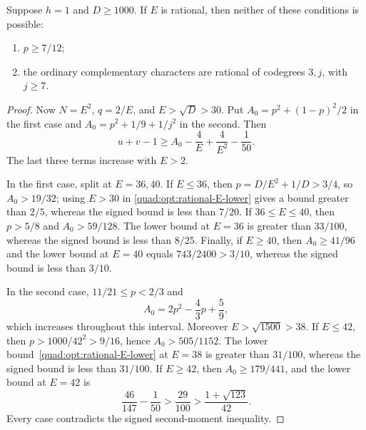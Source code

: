 \begin{lemma}\label{quad:opt:rational-selected-E}
Suppose $h=1$ and $D\ge1000$. If $E$ is rational, then neither of
these conditions is possible:
\begin{enumerate}
\item $p\ge7/12$;
\item the ordinary complementary characters are rational of codegrees
$3,j$, with $j\ge7$.
\end{enumerate}
\end{lemma}
\begin{proof}
Now $N=E^2$, $q=2/E$, and $E>\sqrt D>30$. Put
$A_0=p^2+(1-p)^2/2$ in the first case and
$A_0=p^2+1/9+1/j^2$ in the second. Then
\begin{equation}\label{quad:opt:rational-E-lower}
 u+v-1\ge A_0-\frac4E+\frac4{E^2}-\frac1{50}.
\end{equation}
The last three terms increase with $E>2$.

In the first case, split at $E=36,40$. If $E\le36$, then
$p=D/E^2+1/D>3/4$, so $A_0>19/32$; using $E>30$ in
\eqref{quad:opt:rational-E-lower} gives a bound greater than $2/5$,
whereas the signed bound is less than $7/20$.
If $36\le E\le40$, then $p>5/8$ and $A_0>59/128$. The lower bound
at $E=36$ is greater than $33/100$, whereas the signed bound is less
than $8/25$.
Finally, if $E\ge40$, then $A_0\ge41/96$ and the lower bound at
$E=40$ equals $743/2400>3/10$, whereas the signed bound is less
than $3/10$.

In the second case, $11/21\le p<2/3$ and
\[
 A_0=2p^2-\frac43p+\frac59,
\]
which increases throughout this interval. Moreover $E>\sqrt{1500}>38$.
If $E\le42$, then $p>1000/42^2>9/16$, hence $A_0>505/1152$.
The lower bound~\eqref{quad:opt:rational-E-lower} at $E=38$ is greater
than $31/100$, whereas the signed bound is less than $31/100$.
If $E\ge42$, then $A_0\ge179/441$, and the lower bound at $E=42$ is
\[
 \frac{46}{147}-\frac1{50}>\frac{29}{100}
 >\frac{1+\sqrt{123}}{42}.
\]
Every case contradicts the signed second-moment inequality.
\end{proof}

